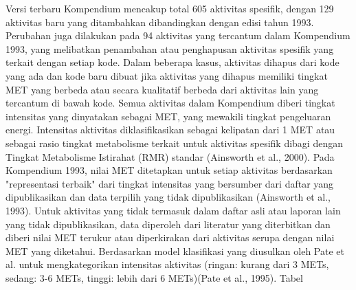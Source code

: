 Versi terbaru Kompendium mencakup total 605 aktivitas spesifik, dengan 129 aktivitas baru yang ditambahkan dibandingkan dengan edisi tahun 1993. Perubahan juga dilakukan pada 94 aktivitas yang tercantum dalam Kompendium 1993, yang melibatkan penambahan atau penghapusan aktivitas spesifik yang terkait dengan setiap kode. Dalam beberapa kasus, aktivitas dihapus dari kode yang ada dan kode baru dibuat jika aktivitas yang dihapus memiliki tingkat MET yang berbeda atau secara kualitatif berbeda dari aktivitas lain yang tercantum di bawah kode. Semua aktivitas dalam Kompendium diberi tingkat intensitas yang dinyatakan sebagai MET, yang mewakili tingkat pengeluaran energi. Intensitas aktivitas diklasifikasikan sebagai kelipatan dari 1 MET atau sebagai rasio tingkat metabolisme terkait untuk aktivitas spesifik dibagi dengan Tingkat Metabolisme Istirahat (RMR) standar (Ainsworth et al., 2000). Pada Kompendium 1993, nilai MET ditetapkan untuk setiap aktivitas berdasarkan "representasi terbaik" dari tingkat intensitas yang bersumber dari daftar yang dipublikasikan dan data terpilih yang tidak dipublikasikan (Ainsworth et al., 1993). Untuk aktivitas yang tidak termasuk dalam daftar asli atau laporan lain yang tidak dipublikasikan, data diperoleh dari literatur yang diterbitkan dan diberi nilai MET terukur atau diperkirakan dari aktivitas serupa dengan nilai MET yang diketahui. Berdasarkan model klasifikasi yang diusulkan oleh Pate et al. untuk mengkategorikan intensitas aktivitas (ringan: kurang dari 3 METs, sedang: 3-6 METs, tinggi: lebih dari 6 METs)(Pate et al., 1995). Tabel 

